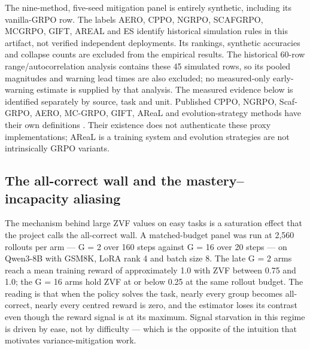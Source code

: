 \documentclass[12pt,a4paper]{report}
\begin{document}
The nine-method, five-seed mitigation panel is entirely synthetic,
including its vanilla-GRPO row. The labels AERO, CPPO, NGRPO, SCAFGRPO,
MCGRPO, GIFT, AREAL and ES identify historical simulation rules in this
artifact, not verified independent deployments. Its rankings, synthetic
accuracies and collapse counts are excluded from the empirical results.
The historical 60-row range/autocorrelation analysis contains these 45
simulated rows, so its pooled magnitudes and warning lead times are also
excluded; no measured-only early-warning estimate is supplied by that
analysis. The measured evidence below is identified separately by
source, task and unit. Published CPPO, NGRPO, Scaf-GRPO, AERO, MC-GRPO,
GIFT, AReaL and evolution-strategy methods have their own definitions
\citep{lin2025cppo, nan2025ngrpo, zhang2025scafgrpo, zhang2026aero, kim2026mcgrpo, wang2025gift, fu2025areal, qiu2025es}.
Their existence does not authenticate these proxy implementations; AReaL
is a training system and evolution strategies are not intrinsically GRPO
variants.

\subsection{The all-correct wall and the mastery--incapacity
aliasing}\label{the-all-correct-wall-and-the-masteryincapacity-aliasing}

The mechanism behind large ZVF values on easy tasks is a saturation
effect that the project calls the all-correct wall. A matched-budget
panel was run at 2,560 rollouts per arm --- G = 2 over 160 steps against
G = 16 over 20 steps --- on Qwen3-8B with GSM8K, LoRA rank 4 and batch
size 8. The late G = 2 arms reach a mean training reward of
approximately 1.0 with ZVF between 0.75 and 1.0; the G = 16 arms hold
ZVF at or below 0.25 at the same rollout budget. The reading is that
when the policy solves the task, nearly every group becomes all-correct,
nearly every centred reward is zero, and the estimator loses its
contrast even though the reward signal is at its maximum. Signal
starvation in this regime is driven by ease, not by difficulty --- which
is the opposite of the intuition that motivates variance-mitigation
work.
\end{document}
